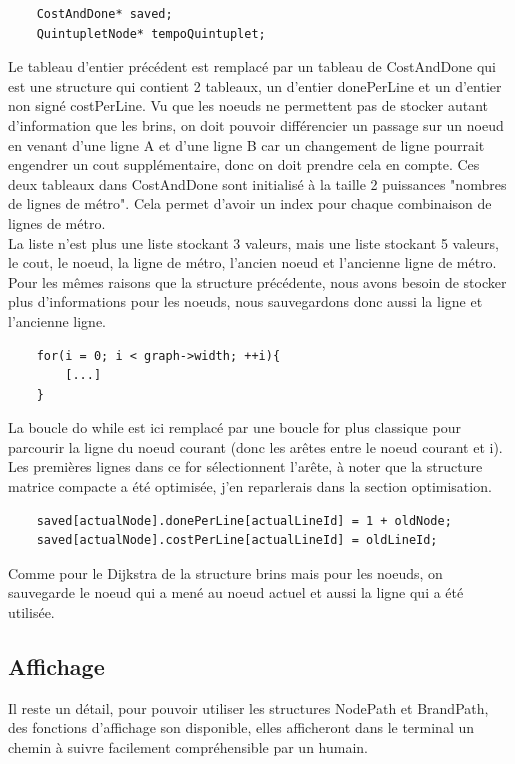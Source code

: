 \documentclass[11pt]{article}
\begin{document}
\begin{lstlisting}
    CostAndDone* saved;
    QuintupletNode* tempoQuintuplet;
\end{lstlisting}
Le tableau d'entier précédent est remplacé par un tableau de CostAndDone qui est une structure qui contient 2 tableaux, un d'entier donePerLine et un d'entier non signé costPerLine. Vu que les noeuds ne permettent pas de stocker autant d'information que les brins, on doit pouvoir différencier un passage sur un noeud en venant d'une ligne A et d'une ligne B car un changement de ligne pourrait engendrer un cout supplémentaire, donc on doit prendre cela en compte. Ces deux tableaux dans CostAndDone sont initialisé à la taille 2 puissances "nombres de lignes de métro". Cela permet d'avoir un index pour chaque combinaison de lignes de métro.\\
La liste n'est plus une liste stockant 3 valeurs, mais une liste stockant 5 valeurs, le cout, le noeud, la ligne de métro, l'ancien noeud et l'ancienne ligne de métro. Pour les mêmes raisons que la structure précédente, nous avons besoin de stocker plus d'informations pour les noeuds, nous sauvegardons donc aussi la ligne et l'ancienne ligne.

\begin{lstlisting}
    for(i = 0; i < graph->width; ++i){
        [...]
    }
\end{lstlisting}
La boucle do while est ici remplacé par une boucle for plus classique pour parcourir la ligne du noeud courant (donc les arêtes entre le noeud courant et i).\\
Les premières lignes dans ce for sélectionnent l'arête, à noter que la structure matrice compacte a été optimisée, j'en reparlerais dans la section optimisation.\\

\begin{lstlisting}
    saved[actualNode].donePerLine[actualLineId] = 1 + oldNode;
    saved[actualNode].costPerLine[actualLineId] = oldLineId;
\end{lstlisting}
Comme pour le Dijkstra de la structure brins mais pour les noeuds, on sauvegarde le noeud qui a mené au noeud actuel et aussi la ligne qui a été utilisée.
\subsection{Affichage}
Il reste un détail, pour pouvoir utiliser les structures NodePath et BrandPath, des fonctions d'affichage son disponible, elles afficheront dans le terminal un chemin à suivre facilement compréhensible par un humain.
\end{document}

